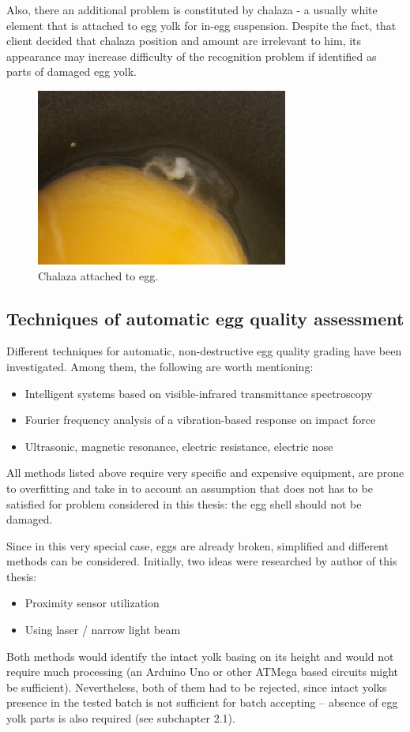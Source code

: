 \documentclass[12pt,twoside,a4paper]{article}
\begin{document}
Also, there an additional problem is constituted by chalaza - a usually white element that is attached to egg yolk for in-egg suspension.
Despite the fact, that client decided that chalaza position and amount are irrelevant to him, its appearance may increase difficulty of the recognition problem if identified as parts of damaged egg yolk.

 
\begin{figure}[H]
\centering
\includegraphics[width=0.4\paperwidth]{chalaza}
\caption{Chalaza attached to egg.}
\end{figure}


\subsection{Techniques of automatic egg quality assessment}

Different techniques for automatic, non-destructive egg quality grading have been investigated.
Among them, the following are worth mentioning:
\begin{itemize}
\item Intelligent systems based on visible-infrared transmittance spectroscopy\cite{agri}
\item Fourier frequency analysis of a vibration-based response on impact force\cite{svm} 
\item Ultrasonic, magnetic resonance, electric resistance, electric nose\cite{nondestr}  
\end{itemize}
All methods listed above require very specific and expensive equipment, are prone to overfitting and take in to account an assumption that does not has to be satisfied for problem considered in this thesis: the egg shell should not be damaged.

Since in this very special case, eggs are already broken, simplified and different methods can be considered.
Initially, two ideas were researched by author of this thesis:
\begin{itemize}
\item Proximity sensor utilization
\item Using laser / narrow light beam 
\end{itemize}
Both methods would identify the intact yolk basing on its height and would not require much processing (an Arduino Uno or other ATMega based circuits might be sufficient).
Nevertheless, both of them had to be rejected, since intact yolks presence in the tested batch is not sufficient for batch accepting – absence of egg yolk parts is also required (see subchapter 2.1).
\end{document}
